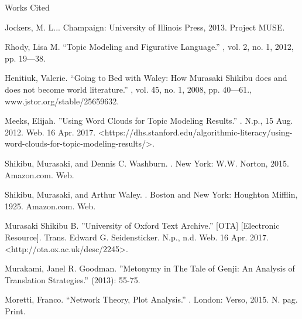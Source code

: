 \documentclass[12pt]{article}
\newcommand{\bibent}{\noindent \hangindent 40pt}
\newenvironment{workscited}{\newpage \begin{center} Works Cited \end{center}}{\newpage }
\begin{document}
\begin{flushleft}
\begin{spacing}{2.0}
\begin{workscited}

\bibent Jockers, M. L... Champaign: University of Illinois Press, 2013. Project MUSE.

\bibent Rhody, Lisa M. ``Topic Modeling and Figurative Language.'' , vol. 2, no. 1, 2012, pp. 19---38.

\bibent Henitiuk, Valerie. ``Going to Bed with Waley: How Murasaki Shikibu does and does not become world literature.'' , vol. 45, no. 1, 2008, pp. 40---61., www.jstor.org/stable/25659632.

\bibent Meeks, Elijah. ''Using Word Clouds for Topic Modeling Results.'' . N.p., 15 Aug. 2012. Web. 16 Apr. 2017. <https://dhs.stanford.edu/algorithmic-literacy/using-word-clouds-for-topic-modeling-results/>.

\bibent Shikibu, Murasaki, and Dennis C. Washburn. . New York: W.W. Norton, 2015. Amazon.com. Web.

\bibent Shikibu, Murasaki, and Arthur Waley. . Boston and New York: Houghton Mifflin, 1925. Amazon.com. Web.

\bibent Murasaki Shikibu B. ''University of Oxford Text Archive.'' [OTA]  [Electronic Resource]. Trans. Edward G. Seidensticker. N.p., n.d. Web. 16 Apr. 2017. <http://ota.ox.ac.uk/desc/2245>.

\bibent Murakami, Janel R. Goodman. ''Metonymy in The Tale of Genji: An Analysis of Translation Strategies.''  (2013): 55-75.

\bibent Moretti, Franco. ``Network Theory, Plot Analysis.'' . London: Verso, 2015. N. pag. Print.

\end{workscited}



\end{spacing}
\end{flushleft}
\end{document}
